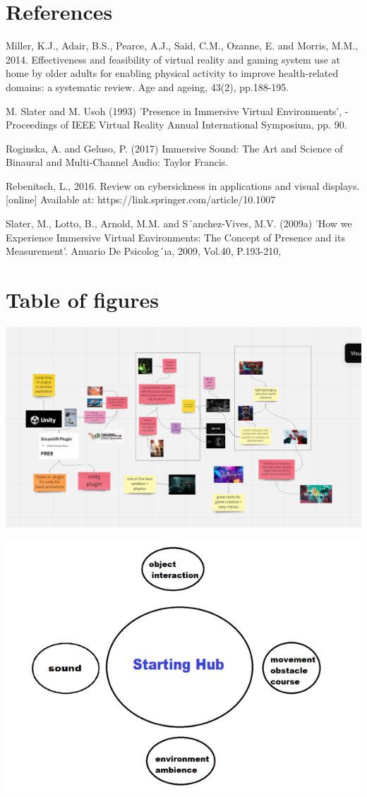 \chapter{References}
Miller, K.J., Adair, B.S., Pearce, A.J., Said, C.M., Ozanne, E. and Morris, M.M., 2014. Effectiveness and feasibility of virtual reality and gaming system use at home by older adults for enabling physical activity to improve health-related domains: a systematic review. Age and ageing, 43(2), pp.188-195. 

M. Slater and M. Usoh (1993) ’Presence in Immersive Virtual Environments’, - Proceedings of IEEE Virtual Reality Annual International Symposium, pp. 90. 

Roginska, A. and Geluso, P. (2017) Immersive Sound: The Art and Science of Binaural and Multi-Channel Audio: Taylor Francis. 

Rebenitsch, L., 2016. Review on cybersickness in applications and visual displays. [online] Available at: https://link.springer.com/article/10.1007%

Slater, M., Lotto, B., Arnold, M.M. and S´anchez-Vives, M.V. (2009a) ’How we Experience Immersive Virtual Environments: The Concept of Presence and its Measurement’. Anuario De Psicolog´ıa, 2009, Vol.40, P.193-210, 


\chapter{Table of figures}

\includegraphics[width=15cm]{Chapters/Picture1.png}

\includegraphics[width=15cm]{Chapters/Picture2.png}

